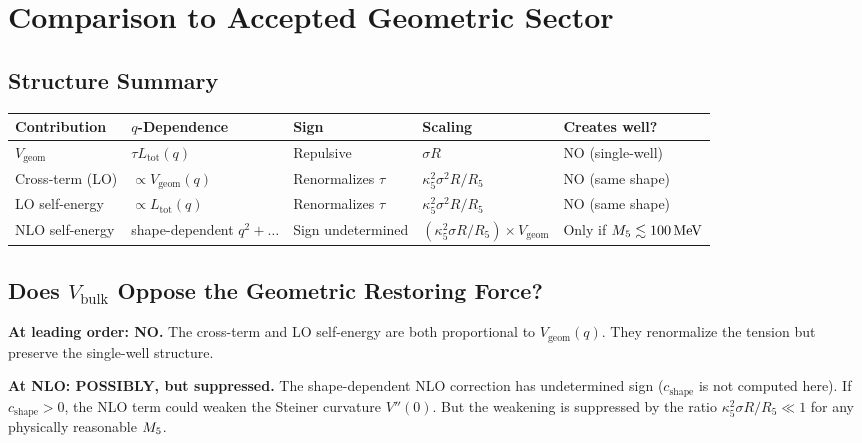 \section{Comparison to Accepted Geometric Sector}
\label{sec:P2N2:comparison}

\subsection{Structure Summary}

\begin{center}
\begin{tabular}{lllll}
\toprule
\textbf{Contribution} & \textbf{$q$-Dependence} & \textbf{Sign}
& \textbf{Scaling} & \textbf{Creates well?} \\
\midrule
$V_{\mathrm{geom}}$ & $\tau L_{\mathrm{tot}}(q)$ & Repulsive
& $\sigma R$ & NO (single-well) \\
Cross-term (LO) & $\propto V_{\mathrm{geom}}(q)$ & Renormalizes $\tau$
& $\kappa_5^2 \sigma^2 R / R_5$ & NO (same shape) \\
LO self-energy & $\propto L_{\mathrm{tot}}(q)$ & Renormalizes $\tau$
& $\kappa_5^2 \sigma^2 R / R_5$ & NO (same shape) \\
NLO self-energy & shape-dependent $q^2 + \ldots$
& Sign undetermined & $(\kappa_5^2 \sigma R/R_5) \times V_{\mathrm{geom}}$
& Only if $M_5 \lesssim 100\,\mathrm{MeV}$ \\
\bottomrule
\end{tabular}
\end{center}

\subsection{Does $V_{\mathrm{bulk}}$ Oppose the Geometric Restoring Force?}

\textbf{At leading order: NO.} The cross-term and LO self-energy are
both proportional to $V_{\mathrm{geom}}(q)$. They renormalize the
tension but preserve the single-well structure.

\textbf{At NLO: POSSIBLY, but suppressed.} The shape-dependent NLO
correction has undetermined sign ($c_{\mathrm{shape}}$ is not
computed here). If $c_{\mathrm{shape}} > 0$, the NLO term could
weaken the Steiner curvature $V''(0)$. But the weakening is
suppressed by the ratio $\kappa_5^2 \sigma R / R_5 \ll 1$ for any
physically reasonable $M_5$.

